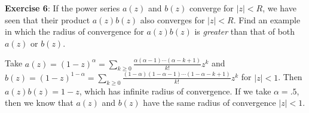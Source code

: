 \documentclass{article}
\begin{document}
\newpage

\textbf{Exercise 6}: If the power series $a(z)$ and $b(z)$ converge for $\lvert z \rvert < R$, we have seen that their product $a(z)b(z)$ also converges for  $\lvert z \rvert < R$. Find an example in which the radius of convergence for $a(z) b(z)$ is \textit{greater} than that of both $a(z)$ or $b(z)$.
    \begin{answer}
        Take $a(z) = (1 - z)^{\alpha} = \sum_{k \geq 0} \frac{\alpha(\alpha - 1) \cdots (\alpha - k + 1)}{k!}z^{k}$ and $b(z) = (1 - z)^{1 - \alpha} = \sum_{k \geq 0} \frac{(1 - \alpha)(1 - \alpha - 1) \cdots (1 - \alpha - k + 1)}{k!}z^{k}$ for $\lvert z \rvert < 1$. Then $a(z)b(z) = 1 - z$, which has infinite radius of convergence. If we take $\alpha = .5$, then we know that $a(z)$ and $b(z)$ have the same radius of convergence $\lvert z \rvert < 1$.
    \end{answer}

\newpage
\end{document}

